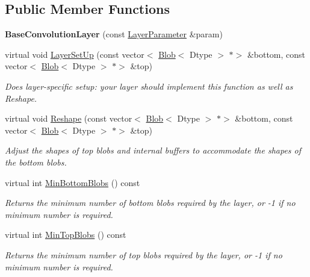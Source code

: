 \subsection*{Public Member Functions}
\begin{DoxyCompactItemize}
\item 
\mbox{\label{classcaffe_1_1_base_convolution_layer_a42f9ea86a8ede098bda11f582a31ffc1}} 
{\bfseries Base\+Convolution\+Layer} (const \mbox{\hyperlink{classcaffe_1_1_layer_parameter}{Layer\+Parameter}} \&param)
\item 
virtual void \mbox{\hyperlink{classcaffe_1_1_base_convolution_layer_a422e1ef9e6c8b4574f7677bb125e234a}{Layer\+Set\+Up}} (const vector$<$ \mbox{\hyperlink{classcaffe_1_1_blob}{Blob}}$<$ Dtype $>$ $\ast$$>$ \&bottom, const vector$<$ \mbox{\hyperlink{classcaffe_1_1_blob}{Blob}}$<$ Dtype $>$ $\ast$$>$ \&top)
\begin{DoxyCompactList}\small\item\em Does layer-\/specific setup\+: your layer should implement this function as well as Reshape. \end{DoxyCompactList}\item 
virtual void \mbox{\hyperlink{classcaffe_1_1_base_convolution_layer_aa215338f200c832081f2719a54bc5256}{Reshape}} (const vector$<$ \mbox{\hyperlink{classcaffe_1_1_blob}{Blob}}$<$ Dtype $>$ $\ast$$>$ \&bottom, const vector$<$ \mbox{\hyperlink{classcaffe_1_1_blob}{Blob}}$<$ Dtype $>$ $\ast$$>$ \&top)
\begin{DoxyCompactList}\small\item\em Adjust the shapes of top blobs and internal buffers to accommodate the shapes of the bottom blobs. \end{DoxyCompactList}\item 
virtual int \mbox{\hyperlink{classcaffe_1_1_base_convolution_layer_aa3d861ed15f6e41c6257d6a10defa7eb}{Min\+Bottom\+Blobs}} () const
\begin{DoxyCompactList}\small\item\em Returns the minimum number of bottom blobs required by the layer, or -\/1 if no minimum number is required. \end{DoxyCompactList}\item 
virtual int \mbox{\hyperlink{classcaffe_1_1_base_convolution_layer_ae4092cf1b48e18e5d82cd714ae6e8547}{Min\+Top\+Blobs}} () const
\begin{DoxyCompactList}\small\item\em Returns the minimum number of top blobs required by the layer, or -\/1 if no minimum number is required. \end{DoxyCompactList}\item 

\end{DoxyCompactItemize}
